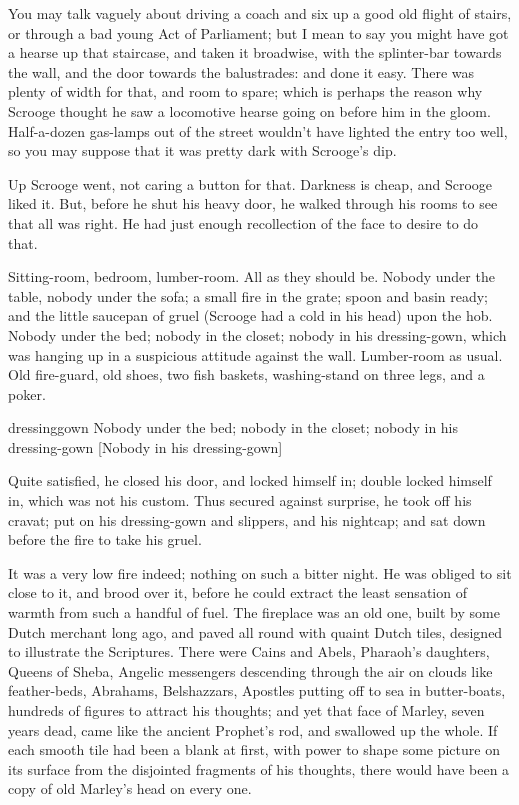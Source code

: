You may talk vaguely about driving a coach and six up a good old flight of stairs, or through a bad young Act of Parliament; but I mean to say you might have got a hearse up that staircase, and taken it broad\-wise, with the splinter-bar towards the wall, and the door towards the balustrades: and done it easy. There was plenty of width for that, and room to spare; which is perhaps the reason why Scrooge thought he saw a locomotive hearse going on before him in the gloom. Half-a-dozen gas-lamps out of the street wouldn't have lighted the entry too well, so you may suppose that it was pretty dark with Scrooge's dip.

Up Scrooge went, not caring a button for that. Darkness is cheap, and Scrooge liked it. But, before he shut his heavy door, he walked through his rooms to see that all was right. He had just enough recollection of the face to desire to do that.

Sitting-room, bedroom, lumber-room. All as they should be. Nobody under the table, nobody under the sofa; a small fire in the grate; spoon and basin ready; and the little saucepan of gruel (Scrooge had a cold in his head) upon the hob. Nobody under the bed; nobody in the closet; nobody in his dressing-gown, which was hanging up in a suspicious attitude against the wall. Lumber-room as usual. Old fire-guard, old shoes, two fish baskets, washing-stand on three legs, and a poker.

\begin{colorbigpic}
	[\smallpicsize]
	{dressinggown}
	{Nobody under the bed; nobody in the closet; nobody in his dressing-gown}
	[Nobody in his dressing-gown]
\end{colorbigpic}

 
Quite satisfied, he closed his door, and locked himself in; double locked himself in, which was not his custom. Thus secured against surprise, he took off his cravat; put on his dressing-gown and slippers, and his nightcap; and sat down before the fire to take his gruel.

It was a very low fire indeed; nothing on such a bitter night. He was obliged to sit close to it, and brood over it, before he could extract the least sensation of warmth from such a handful of fuel. The fireplace was an old one, built by some Dutch merchant long ago, and paved all round with quaint Dutch tiles, designed to illustrate the Scriptures. There were Cains and Abels, Pharaoh's daughters, Queens of Sheba, Angelic messengers descending  through the air on clouds like feather-beds, Abrahams, Belshazzars, Apostles putting off to sea in butter-boats, hundreds of figures to attract his thoughts; and yet that face of Marley, seven years dead, came like the ancient Prophet's rod, and swallowed up the whole. If each smooth tile had been a blank at first, with power to shape some picture on its surface from the disjointed fragments of his thoughts, there would have been a copy of old Marley's head on every one.

